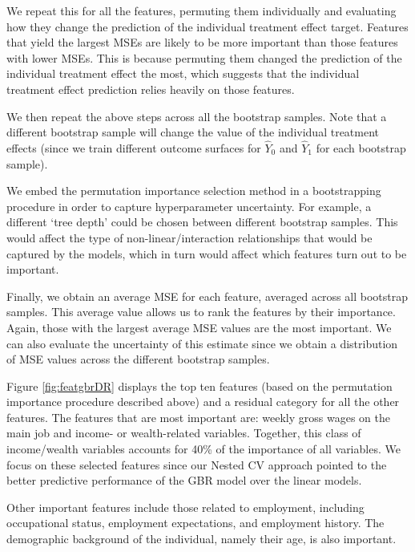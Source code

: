 \documentclass[12pt, a4paper]{article}
\begin{document}
We repeat this for all the features, permuting them individually and evaluating how they change the prediction of the individual treatment effect target. Features that yield the largest MSEs are likely to be more important than those features with lower MSEs. This is because permuting them changed the prediction of the individual treatment effect the most, which suggests that the individual treatment effect prediction relies heavily on those features.

We then repeat the above steps across all the bootstrap samples. Note that a different bootstrap sample will change the value of the individual treatment effects (since we train different outcome surfaces for $\hat{Y}_0$ and $\hat{Y}_1$ for each bootstrap sample).

We embed the permutation importance selection method in a bootstrapping procedure in order to capture hyperparameter uncertainty. For example, a different ‘tree depth’ could be chosen between different bootstrap samples. This would affect the type of non-linear/interaction relationships that would be captured by the models, which in turn would affect which features turn out to be important. 

Finally, we obtain an average MSE for each feature, averaged across all bootstrap samples. This average value allows us to rank the features by their importance. Again, those with the largest average MSE values are the most important. We can also evaluate the uncertainty of this estimate since we obtain a distribution of MSE values across the different bootstrap samples.

Figure \ref{fig:featgbrDR} displays the top ten features (based on the permutation importance procedure described above) and a residual category for all the other features. The features that are most important are: weekly gross wages on the main job and income- or wealth-related variables. Together, this class of income/wealth variables accounts for 40\% of the importance of all variables. We focus on these selected features since our Nested CV approach pointed to the better predictive performance of the GBR model over the linear models.

Other important features include those related to employment, including occupational status, employment expectations, and employment history. The demographic background of the individual, namely their age, is also important. 

\end{document}
